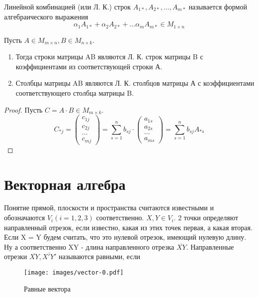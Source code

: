 \begin{definition}
	Линейной комбинацией (или Л. К.) строк \(A_{1*}, A_{2*},\ldots, A_{m*}\) называется формой алгебраического выражения 
	\[\alpha_1 A_{1*}+\alpha_2 A_{2*} +\ldots \alpha_m A_{m*}\in M_{1\times n}\]
\end{definition}
\begin{proposition}
	Пусть \(A\in M_{m\times n}, B\in M_{n\times k}\).
	\begin{enumerate}
		\item Тогда строки матрицы AB являются Л. К. строк матрицы B с коэффициентами из соответствующей строки А.
		\item Столбцы матрицы AB являются Л. К. столбцов матрицы А с коэффициентами соответствующего столбца матрицы B.
	\end{enumerate} 
	\begin{proof}
		Пусть \( C = A\cdot B\in M_{m\times k}\). 
		\[C_{*j} = \begin{pmatrix}
			c_{1j} \\ c_{2j} \\ \ldots \\ c_{mj}
		\end{pmatrix} = \sum_{s=1}^{n}b_{sj}\cdot\begin{pmatrix}
			a_{1s} \\ a_{2s} \\ \ldots \\ a_{ms}
		\end{pmatrix} = \sum_{s=1}^{n}b_{sj}A_{*s}\]
	\end{proof}
\end{proposition}
\newpage
\section{Векторная алгебра}
Понятие прямой, плоскости и пространства считаются известными и обозначаются \(V_i(i = 1, 2, 3)\) соответственно.
\(X, Y\in V_i\). 2 точки определяют направленный отрезок, если известно, какая из этих точек первая, а какая вторая. Если X = Y будем считать, что это нулевой отрезок, имеющий нулевую длину. Ну а соответственно XY - длина направленного отрезка \(\overline{XY}\). Направленные отрезки \(\overline{XY}, \overline{X'Y'}\) называются равными, если 
\begin{wrapfigure}{r}{0.4\textwidth}
	\centering
	\texttt{[image: images/vector-0.pdf]}
	\caption{Равные вектора}
	\label{Vector0}
\end{wrapfigure}

